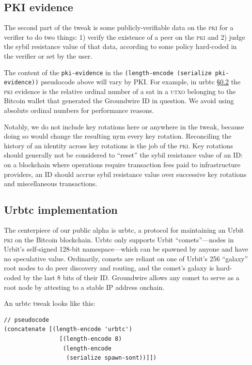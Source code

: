 \documentclass[twoside]{article}
\begin{document}
\subsection[\textsc{pki} evidence]{PKI evidence}\label{pki-evidence}

The second part of the tweak is some publicly-verifiable data on the \textsc{pki}
for a verifier to do two things: 1) verify the existence of a peer on
the \textsc{pki} and 2) judge the sybil resistance value of that data, according
to some policy hard-coded in the verifier or set by the user.

The content of the \texttt{pki-evidence} in the
\texttt{(length-encode\ (serialize\ pki-evidence))} pseudocode above will vary by PKI.
For example, in urbtc \S\ref{urbtc-implementation} the \textsc{pki} evidence is the
relative ordinal number \citep{Rodarmor2022Ordinals} of a sat
in a \textsc{utxo} belonging to the Bitcoin wallet that generated the Groundwire
ID in question. We avoid using absolute ordinal numbers for performance
reasons.

Notably, we do not include key rotations here or anywhere in the tweak,
because doing so would change the resulting nym every key rotation.
Reconciling the history of an identity across key rotations is the job
of the \textsc{pki}. Key rotations should generally not be considered to
``reset'' the sybil resistance value of an ID: on a blockchain where
operations require transaction fees paid to infrastructure providers, an
ID should accrue sybil resistance value over successive key rotations
and miscellaneous transactions.

\subsection{Urbtc implementation}\label{urbtc-implementation}

\sloppy
The centerpiece of our public alpha is urbtc, a protocol for maintaining
an Urbit \textsc{pki} on the Bitcoin blockchain. Urbtc only supports Urbit
``comets''---nodes in Urbit's self-signed 128-bit namespace---which
can be spawned by anyone and have no speculative value. Ordinarily,
comets are reliant on one of \mbox{Urbit's} 256 ``galaxy'' root nodes to do
peer discovery and routing, and the comet's galaxy is hard-coded by the
last 8 bits of their ID. Groundwire allows any comet to serve as a root
node by attesting to a stable IP address onchain.

An urbtc tweak looks like this:

\begin{lstlisting}[style=listingcode]
// pseudocode
(concatenate [(length-encode 'urbtc')
                [(length-encode 8)
                 (length-encode
                  (serialize spawn-sont))]])
\end{lstlisting}
\end{document}
